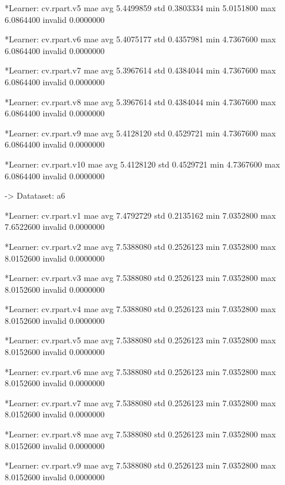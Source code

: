 \documentclass{article}
\begin{document}
\begin{Schunk}
\begin{Soutput}
	*Learner: cv.rpart.v5 
              mae
avg     5.4499859
std     0.3803334
min     5.0151800
max     6.0864400
invalid 0.0000000

	*Learner: cv.rpart.v6 
              mae
avg     5.4075177
std     0.4357981
min     4.7367600
max     6.0864400
invalid 0.0000000

	*Learner: cv.rpart.v7 
              mae
avg     5.3967614
std     0.4384044
min     4.7367600
max     6.0864400
invalid 0.0000000

	*Learner: cv.rpart.v8 
              mae
avg     5.3967614
std     0.4384044
min     4.7367600
max     6.0864400
invalid 0.0000000

	*Learner: cv.rpart.v9 
              mae
avg     5.4128120
std     0.4529721
min     4.7367600
max     6.0864400
invalid 0.0000000

	*Learner: cv.rpart.v10 
              mae
avg     5.4128120
std     0.4529721
min     4.7367600
max     6.0864400
invalid 0.0000000


-> Datataset:  a6 

	*Learner: cv.rpart.v1 
              mae
avg     7.4792729
std     0.2135162
min     7.0352800
max     7.6522600
invalid 0.0000000

	*Learner: cv.rpart.v2 
              mae
avg     7.5388080
std     0.2526123
min     7.0352800
max     8.0152600
invalid 0.0000000

	*Learner: cv.rpart.v3 
              mae
avg     7.5388080
std     0.2526123
min     7.0352800
max     8.0152600
invalid 0.0000000

	*Learner: cv.rpart.v4 
              mae
avg     7.5388080
std     0.2526123
min     7.0352800
max     8.0152600
invalid 0.0000000

	*Learner: cv.rpart.v5 
              mae
avg     7.5388080
std     0.2526123
min     7.0352800
max     8.0152600
invalid 0.0000000

	*Learner: cv.rpart.v6 
              mae
avg     7.5388080
std     0.2526123
min     7.0352800
max     8.0152600
invalid 0.0000000

	*Learner: cv.rpart.v7 
              mae
avg     7.5388080
std     0.2526123
min     7.0352800
max     8.0152600
invalid 0.0000000

	*Learner: cv.rpart.v8 
              mae
avg     7.5388080
std     0.2526123
min     7.0352800
max     8.0152600
invalid 0.0000000

	*Learner: cv.rpart.v9 
              mae
avg     7.5388080
std     0.2526123
min     7.0352800
max     8.0152600
invalid 0.0000000


\end{Soutput}
\end{Schunk}
\end{document}
